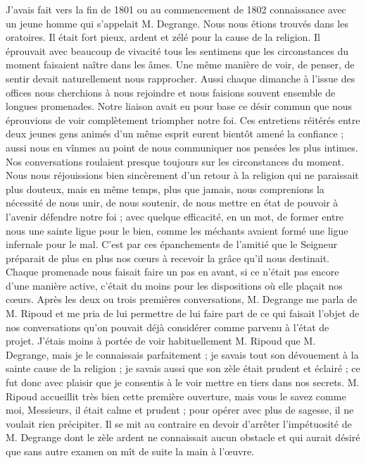 J'avais fait vers la fin de 1801 ou au commencement de 1802 connaissance avec un jeune homme qui s'appelait M. Degrange. Nous nous étions trouvés dans les oratoires. Il était fort pieux, ardent et zélé pour la cause de la religion.
Il éprouvait avec beaucoup de vivacité tous les sentimens que les circonstances du moment faisaient naître dans les âmes. Une même manière de voir, de penser, de sentir devait naturellement nous rapprocher. Aussi chaque dimanche à l'issue des offices nous cherchions à nous rejoindre et nous faisions souvent ensemble de longues promenades. Notre liaison avait eu pour base ce désir commun que nous éprouvions de voir complètement triompher notre foi. Ces entretiens réitérés entre deux jeunes gens animés d'un même esprit eurent bientôt amené la confiance ; aussi nous en vînmes au point de nous communiquer nos pensées les plus intimes. Nos conversations roulaient presque toujours sur les circonstances du moment. Nous nous réjouissions bien sincèrement d'un retour à la religion qui ne paraissait plus douteux, mais en même temps, plus que jamais, nous comprenions la nécessité de nous unir, de nous soutenir, de nous mettre en état de pouvoir à l'avenir défendre notre foi ; avec quelque efficacité, en un mot, de former entre nous une sainte ligue pour le bien, comme les méchants avaient formé une ligue infernale pour le mal. C’est par ces épanchements de l’amitié que le Seigneur préparait de plus en plus nos cœurs à recevoir la grâce qu'il nous destinait. Chaque promenade nous faisait faire un pas en avant, si ce n'était pas encore d'une manière active, c'était du moins pour les dispositions où elle plaçait nos cœurs. Après les deux ou trois premières conversations, M. Degrange me parla de M. Ripoud et me pria de lui permettre de lui faire part
de ce qui faisait l'objet de nos conversations qu'on pouvait déjà considérer comme parvenu à l'état de projet. J'étais moins à portée de voir habituellement M. Ripoud que M. Degrange, mais je le connaissais parfaitement ; je savais tout son dévouement à la sainte cause de la religion ; je savais aussi que son zèle était prudent et éclairé ; ce fut donc avec plaisir que je consentis à le voir mettre en tiers dans nos secrets. M. Ripoud accueillit très bien cette première ouverture, mais vous le savez comme moi, Messieurs, il était calme et prudent ; pour opérer avec plus de sagesse, il ne voulait rien précipiter. Il se mit au contraire en devoir d'arrêter l'impétuosité de M. Degrange dont le zèle ardent ne connaissait aucun obstacle et qui aurait désiré que sans autre examen on mît de suite la main à l'œuvre.

